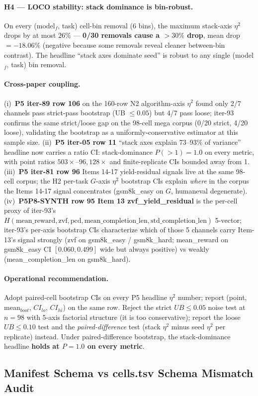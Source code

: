 \documentclass{article}  \usepackage[preprint,nonatbib]{neurips_2026} \usepackage[numbers]{natbib}
\begin{document}
\paragraph{H4 --- LOCO stability: stack dominance is bin-robust.}
On every (model$_f$, task) cell-bin removal (6 bins), the maximum
stack-axis $\eta^2$ drops by at most $26\%$ --- \textbf{0/30
removals cause a $>30\%$ drop}, mean drop $= -18.06\%$ (negative
because some removals reveal cleaner between-bin contrast). The
headline ``stack axes dominate seed'' is robust to any single
(model$_f$, task) bin removal.

\paragraph{Cross-paper coupling.}
(i)~\textbf{P5 iter-89 row 106} on the 160-row N2 algorithm-axis
$\eta^2$ found only 2/7 channels pass strict-pass bootstrap
(UB $\leq 0.05$) but 4/7 pass loose; iter-93 confirms the same
strict/loose gap on the 98-cell mega corpus (0/20 strict, 4/20
loose), validating the bootstrap as a uniformly-conservative
estimator at this sample size. (ii)~\textbf{P5 iter-05 row 11}
``stack axes explain 73--93\% of variance'' headline now carries a
ratio CI: stack-dominance $P(>1) = 1.0$ on every metric, with
point ratios $503\times$--$96{,}128\times$ and finite-replicate
CIs bounded away from 1. (iii)~\textbf{P5 iter-81 row 96} Items
14-17 yield-residual signals live at the same 98-cell corpus; the
H2 per-task $G$-axis $\eta^2$ bootstrap CIs explain \emph{where}
in the corpus the Items 14-17 signal concentrates (gsm8k\_easy on
$G$, humaneval degenerate). (iv)~\textbf{P5P8-SYNTH row 95 Item 13
zvf\_yield\_residual} is the per-cell proxy of iter-93's
$H(\mathrm{mean\_reward, zvf, pcd, mean\_completion\_len,
std\_completion\_len})$ 5-vector; iter-93's per-axis bootstrap CIs
characterize which of those 5 channels carry Item-13's signal
strongly (zvf on gsm8k\_easy / gsm8k\_hard; mean\_reward on
gsm8k\_easy CI $[0.060, 0.499]$ wide but always positive) vs
weakly (mean\_completion\_len on gsm8k\_hard).

\paragraph{Operational recommendation.}
Adopt paired-cell bootstrap CIs on every P5 headline $\eta^2$
number; report (point, mean$_{boot}$, $CI_{lo}$, $CI_{hi}$) on the
same row. Reject the strict $UB \leq 0.05$ noise test at
$n{=}98$ with 5-axis factorial structure (it is too conservative);
report the loose $UB \leq 0.10$ test and the \emph{paired-difference}
test (stack $\eta^2$ minus seed $\eta^2$ per replicate) instead.
Under paired-difference bootstrap, the stack-dominance headline
\textbf{holds at $P{=}1.0$ on every metric}. \subsection{Manifest Schema vs cells.tsv Schema Mismatch Audit}
\label{sec:p5-iter97-schema-mismatch}
\end{document}
